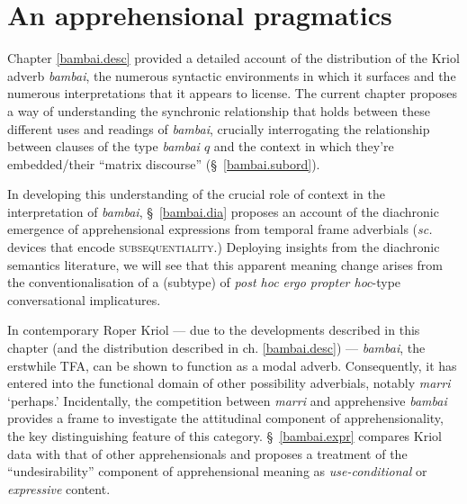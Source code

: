 \chapter{An apprehensional pragmatics}\label{bambai.prag}



Chapter \ref{bambai.desc} provided a detailed account of the distribution of the Kriol adverb \textit{bambai}, the numerous syntactic environments in which it surfaces and the numerous interpretations that it appears to license. The current chapter proposes a way of understanding the synchronic relationship that holds between these different uses and readings of \textit{bambai}, crucially interrogating the relationship between clauses of the type \textit{bambai $ q $} and the context in which they're embedded/their ``matrix discourse'' (\S~\ref{bambai.subord}).

In developing this understanding of the crucial role of context in the interpretation of \textit{bambai}, \S~\ref{bambai.dia} proposes an account of the diachronic emergence of apprehensional expressions from temporal frame adverbials (\textit{sc.} devices that encode \textsc{subsequentiality}.) Deploying insights from the diachronic semantics literature, we will see that this apparent meaning change arises from the conventionalisation of a (subtype) of \textit{post hoc ergo propter hoc}-type conversational implicatures.



In contemporary Roper Kriol --- due to the developments described in this chapter (and the distribution described in ch. \ref{bambai.desc}) --- \textit{bambai}, the erstwhile TFA, can be shown to function as a modal adverb. Consequently, it has entered into the functional domain of other possibility adverbials, notably \textit{marri} `perhaps.' Incidentally, the competition between \textit{marri} and apprehensive \textit{bambai} provides a frame to investigate the attitudinal component of apprehensionality, the key distinguishing feature of this category. \S~\ref{bambai.expr} compares Kriol data with that of other apprehensionals and proposes a treatment of the ``undesirability'' component of apprehensional meaning as \textit{use-conditional} or \textit{expressive} content.





